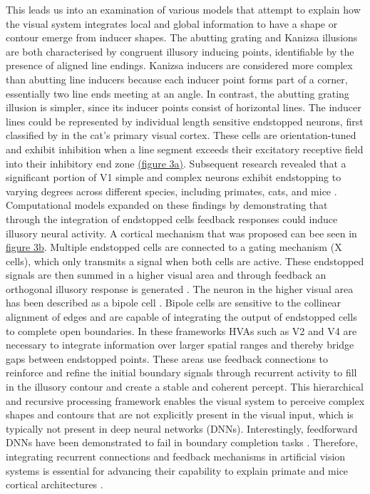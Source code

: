 \documentclass[12pt]{article}
\begin{document}
This leads us into an examination of various models that attempt to explain how the visual system integrates local and global information to have a shape or contour emerge from inducer shapes. The abutting grating and Kanizsa illusions are both characterised by congruent illusory inducing points, identifiable by the presence of aligned line endings. Kanizsa inducers are considered more complex than abutting line inducers because each inducer point forms part of a corner, essentially two line ends meeting at an angle. In contrast, the abutting grating illusion is simpler, since its inducer points consist of horizontal lines. The inducer lines could be represented by individual length sensitive endstopped neurons, first classified by \textcite{hubelRECEPTIVEFIELDSFUNCTIONAL1965} in the cat's primary visual cortex. These cells are orientation-tuned and exhibit inhibition when a line segment exceeds their excitatory receptive field into their inhibitory end zone \hyperref[fig:endstop_mechanism]{(figure 3a)}. Subsequent research revealed that a significant portion of V1 simple and complex neurons exhibit endstopping to varying degrees across different species, including primates, cats, and mice \autocite{deangelisLengthWidthTuning1994,jonesSurroundSuppressionPrimate2001,sceniakVisualSpatialCharacterization2001}. Computational models expanded on these findings by demonstrating that through the integration of endstopped cells feedback responses could induce illusory neural activity. A cortical mechanism that was proposed can bee seen in \hyperref[fig:endstop_mechanism]{figure 3b}. Multiple endstopped cells are connected to a gating mechanism (X cells), which only transmits a signal when both cells are active. These endstopped signals are then summed in a higher visual area and through feedback an orthogonal illusory response is generated \autocite{vonderheydtIllusoryContoursCortical1984}. The neuron in the higher visual area has been described as a bipole cell \autocite{grossbergRoleIllusoryContours1987}. Bipole cells are sensitive to the collinear alignment of edges and are capable of integrating the output of endstopped cells to complete open boundaries. In these frameworks HVAs such as V2 and V4 are necessary to integrate information over larger spatial ranges and thereby bridge gaps between endstopped points. These areas use feedback connections to reinforce and refine the initial boundary signals through recurrent activity to fill in the illusory contour and create a stable and coherent percept. This hierarchical and recursive processing framework enables the visual system to perceive complex shapes and contours that are not explicitly present in the visual input, which is typically not present in deep neural networks (DNNs). Interestingly, feedforward DNNs have been demonstrated to fail in boundary completion tasks \autocite{fanChallengingDeepLearning2023}. Therefore, integrating recurrent connections and feedback mechanisms in artificial vision systems is essential for advancing their capability to explain primate and mice cortical architectures \autocite{grossbergHowVisualIllusions2014,grossbergTextureSegregationSurface1998}.
\end{document}
